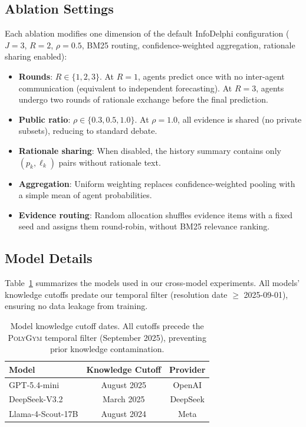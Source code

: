 \documentclass[11pt]{article}
\theoremstyle{plain}
\theoremstyle{definition}
\begin{document}
\subsection{Ablation Settings}

Each ablation modifies one dimension of the default InfoDelphi configuration ($J{=}3$, $R{=}2$, $\rho{=}0.5$, BM25 routing, confidence-weighted aggregation, rationale sharing enabled):

\begin{itemize}[nosep]
  \item \textbf{Rounds}: $R \in \{1, 2, 3\}$. At $R{=}1$, agents predict once with no inter-agent communication (equivalent to independent forecasting). At $R{=}3$, agents undergo two rounds of rationale exchange before the final prediction.
  \item \textbf{Public ratio}: $\rho \in \{0.3, 0.5, 1.0\}$. At $\rho{=}1.0$, all evidence is shared (no private subsets), reducing to standard debate.
  \item \textbf{Rationale sharing}: When disabled, the history summary contains only $(p_k, \ell_k)$ pairs without rationale text.
  \item \textbf{Aggregation}: Uniform weighting replaces confidence-weighted pooling with a simple mean of agent probabilities.
  \item \textbf{Evidence routing}: Random allocation shuffles evidence items with a fixed seed and assigns them round-robin, without BM25 relevance ranking.
\end{itemize}

\subsection{Model Details}

Table~\ref{tab:model_details} summarizes the models used in our cross-model experiments. All models' knowledge cutoffs predate our temporal filter (resolution date $\geq$ 2025-09-01), ensuring no data leakage from training.

\begin{table}[h]
\centering
\small
\begin{tabular}{lcc}
\toprule
\textbf{Model} & \textbf{Knowledge Cutoff} & \textbf{Provider} \\
\midrule
GPT-5.4-mini & August 2025 & OpenAI \\
DeepSeek-V3.2 & March 2025 & DeepSeek \\
Llama-4-Scout-17B & August 2024 & Meta \\
\bottomrule
\end{tabular}
\caption{Model knowledge cutoff dates. All cutoffs precede the \textsc{PolyGym} temporal filter (September 2025), preventing prior knowledge contamination.}
\label{tab:model_details}
\end{table}
\end{document}
